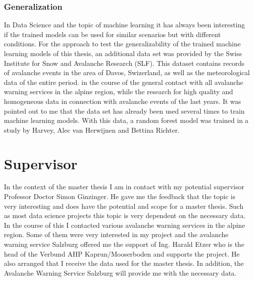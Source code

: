 \documentclass[12pt,a4paper]{article}
\begin{document}
\subsubsection{Generalization}
In Data Science and the topic of machine learning it has always been interesting if the trained models can be used for similar scenarios but with different conditions. 
For the approach to test the generalizability of the trained machine learning models of this thesis, an additional data set was provided by the Swiss Institute for Snow and Avalanche Research (SLF). This dataset contains records of avalanche events in the area of Davos, Swizerland, as well as the meteorological data of the entire period. in the course of the general contact with all avalanche warning services in the alpine region, while the research for high quality and homogeneous data in connection with avalanche events of the last years. It was pointed out to me that the data set has already been used several times to train machine learning models.  With this data, a random forest model was trained in a study by Harvey, Alec van Herwijnen and Bettina Richter.






\section{Supervisor}
In the context of the master thesis I am in contact with my potential supervisor Professor Doctor Simon Ginzinger. He gave me the feedback that the topic is very interesting and does have the potential and scope for a master thesis. Such as most data science projects this topic is very dependent on the necessary data. In the course of this I contacted various avalanche warning services in the alpine region. 
Some of them were very interested in my project and the avalanche warning service Salzburg offered me the support of Ing. Harald Etzer who is the head of the Verbund AHP Kaprun/Mooserboden and supports the project. He also arranged that I receive the data used for the master thesis. In addition, the Avalanche Warning Service Salzburg will provide me with the necessary data.




\newpage
{}
\printbibliography
\end{document}
